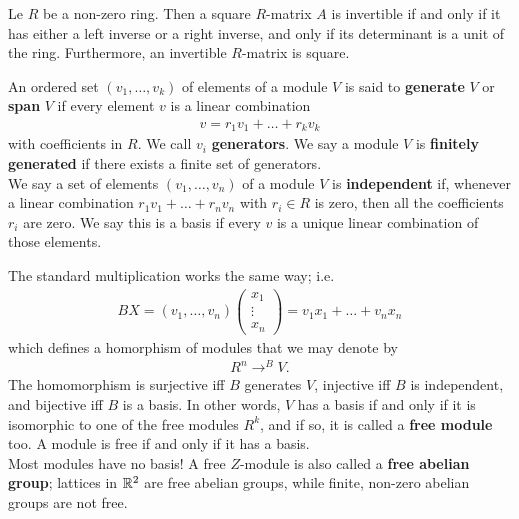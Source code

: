 \documentclass{memoir}
\begin{document}
\begin{lemma}
	Le \(R\) be a non-zero ring. Then a square \(R\)-matrix \(A\) is invertible if and only if it has either a left inverse or a right inverse, and only if its determinant is a unit of the ring. Furthermore, an invertible \(R\)-matrix is square.
\end{lemma}

\begin{defn}[Span]
	An ordered set \((v_1,\ldots,v_k)\) of elements of a module \(V\) is said to \textbf{generate} \(V\) or \textbf{span} \(V\) if every element \(v\) is a linear combination
	\begin{align*}
		v = r_1v_1 + \ldots + r_kv_k
	\end{align*}
	with coefficients in \(R\). We call \(v_i\) \textbf{generators}. We say a module \(V\) is \textbf{finitely generated} if there exists a finite set of generators.\\

	We say a set of elements \((v_1,\ldots,v_n)\) of a module \(V\) is \textbf{independent} if, whenever a linear combination \(r_1v_1 + \ldots + r_nv_n\) with \(r_i \in R\) is zero, then all the coefficients \(r_i\) are zero. We say this is a basis if every \(v\) is a unique linear combination of those elements.
\end{defn}
The standard multiplication works the same way; i.e.
\begin{align*}
	BX = (v_1,\ldots,v_n) \begin{pmatrix} x_1 \\ \vdots \\ x_n \end{pmatrix} = v_1x_1 + \ldots + v_nx_n
\end{align*}
which defines a homorphism of modules that we may denote by
\begin{align*}
	R^{n} \to^{B} V.
\end{align*}
The homomorphism is surjective iff \(B\) generates \(V\), injective iff \(B\) is independent, and bijective iff \(B\) is a basis. In other words, \(V\) has a basis if and only if it is isomorphic to one of the free modules \(R^{k}\), and if so, it is called a \textbf{free module} too. A module is free if and only if it has a basis.\\

Most modules have no basis! A free \(Z\)-module is also called a \textbf{free abelian group}; lattices in \(\mathbb{R}^2\) are free abelian groups, while finite, non-zero abelian groups are not free.
\end{document}
